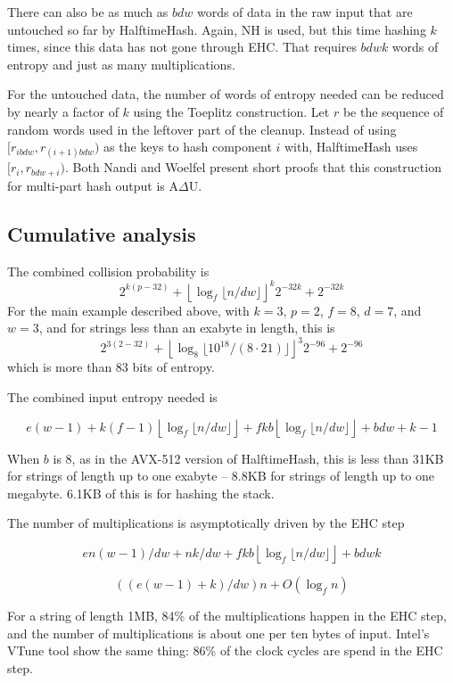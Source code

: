 \documentclass[acmsmall, nonacm]{acmart}
\begin{document}
There can also be as much as $b d w$ words of data in the raw input that are untouched so far by HalftimeHash.
Again, NH is used, but this time hashing $k$ times, since this data has not gone through EHC.
That requires $b d w k$ words of entropy and just as many multiplications.

For the untouched data, the number of words of entropy needed can be reduced by nearly a factor of $k$ using the Toeplitz construction. 
Let $r$ be the sequence of random words used in the leftover part of the cleanup.
Instead of using $[r_{ibdw}, r_{(i+1)bdw})$ as the keys to hash component $i$ with, HalftimeHash uses $[r_{i}, r_{bdw + i})$.
Both Nandi and Woelfel present short proofs that this construction for multi-part hash output is A$\Delta$U. \cite{ehc-nandi,woelfel-toeplitz}


\subsection{Cumulative analysis}

The combined collision probability is
\[2^{k(p-32)} + \left\lfloor \log_f \lfloor n / d w \rfloor \right\rfloor^k 2^{-32k} + 2^{-32k}\]
For the main example described above, with $k=3$, $p=2$, $f=8$, $d = 7$, and $w=3$, and for strings less than an exabyte in length, this is
\[2^{3(2-32)} + \left\lfloor \log_8 \lfloor 10^{18} /(8 \cdot 21) \rfloor \right\rfloor^3 2^{-96} + 2^{-96}\]
which is more than 83 bits of entropy.

The combined input entropy needed is

\[
e(w-1)
+ k(f-1)\left\lfloor\log_f \lfloor n/dw\rfloor\right\rfloor
+ f k b \left\lfloor\log_f \lfloor n/dw\rfloor\right\rfloor
+ b d w + k - 1
\]

When $b$ is 8, as in the AVX-512 version of HalftimeHash, this is less than 31KB for strings of length up to one exabyte -- 8.8KB for strings of length up to one megabyte.
6.1KB of this is for hashing the stack.

The number of multiplications is asymptotically driven by the EHC step

\[
en(w-1)/dw + nk/dw + f k b \left\lfloor\log_f \lfloor n/dw\rfloor\right\rfloor + b d w k
\]

\[
((e(w-1) + k)/dw)n + O(\log_f n)
\]

For a string of length 1MB, 84\% of the multiplications happen in the EHC step, and the number of multiplications is about one per ten bytes of input.
Intel's VTune tool show the same thing: 86\% of the clock cycles are spend in the EHC step.
\end{document}
